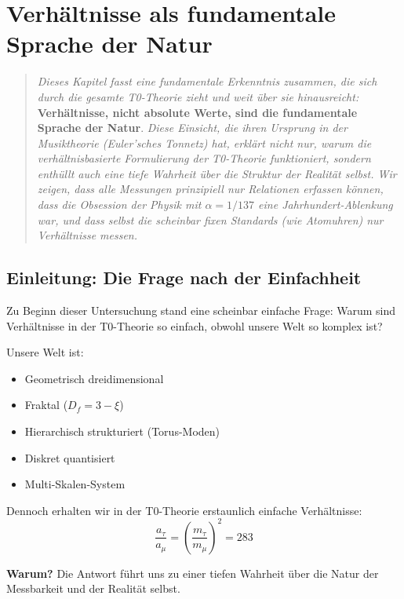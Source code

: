\chapter{Verhältnisse als fundamentale Sprache der Natur}
\label{chap:verhaeltnisse_fundamental}

\begin{quote}
	\textit{Dieses Kapitel fasst eine fundamentale Erkenntnis zusammen, die sich durch die gesamte T0-Theorie zieht und weit über sie hinausreicht:} \textbf{Verhältnisse, nicht absolute Werte, sind die fundamentale Sprache der Natur}. \textit{Diese Einsicht, die ihren Ursprung in der Musiktheorie (Euler'sches Tonnetz) hat, erklärt nicht nur, warum die verhältnisbasierte Formulierung der T0-Theorie funktioniert, sondern enthüllt auch eine tiefe Wahrheit über die Struktur der Realität selbst. Wir zeigen, dass alle Messungen prinzipiell nur Relationen erfassen können, dass die Obsession der Physik mit $\alpha = 1/137$ eine Jahrhundert-Ablenkung war, und dass selbst die scheinbar fixen Standards (wie Atomuhren) nur Verhältnisse messen.}
\end{quote}

\section{Einleitung: Die Frage nach der Einfachheit}

Zu Beginn dieser Untersuchung stand eine scheinbar einfache Frage: Warum sind Verhältnisse in der T0-Theorie so einfach, obwohl unsere Welt so komplex ist?

Unsere Welt ist:
\begin{itemize}[nosep]
	\item Geometrisch dreidimensional
	\item Fraktal ($D_f = 3 - \xi$)
	\item Hierarchisch strukturiert (Torus-Moden)
	\item Diskret quantisiert
	\item Multi-Skalen-System
\end{itemize}

Dennoch erhalten wir in der T0-Theorie erstaunlich einfache Verhältnisse:
\begin{equation}
	\frac{a_\tau}{a_\mu} = \left(\frac{m_\tau}{m_\mu}\right)^2 = 283
	\label{eq:simple_ratio}
\end{equation}

\textbf{Warum?} Die Antwort führt uns zu einer tiefen Wahrheit über die Natur der Messbarkeit und der Realität selbst.

